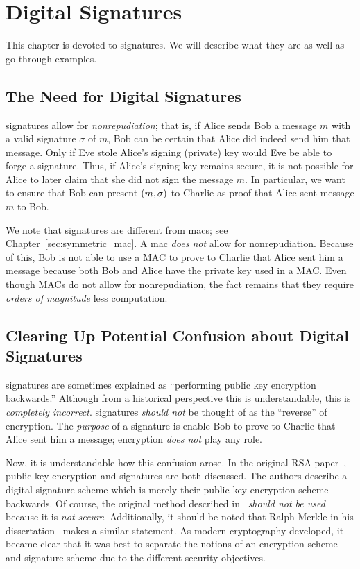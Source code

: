 \chapter{Digital Signatures}
\label{chap:signatures}

This chapter is devoted to \glspl{signature}.
We will describe what they are as well as go through examples.



\section{The Need for Digital Signatures}

\Glspl{signature} allow for \emph{nonrepudiation};
that is, if Alice sends Bob a message $m$ with a valid \gls{signature}
$\sigma$ of $m$, Bob can be certain that Alice did indeed
send him that message.
Only if Eve stole Alice's signing (private) key would Eve be able
to forge a signature.
Thus, if Alice's signing key remains secure, it is not possible
for Alice to later claim that she did not sign the message $m$.
In particular, we want to ensure that Bob can present $\left( m,\sigma \right)$
to Charlie as proof that Alice sent message $m$ to Bob.

We note that \glspl{signature} are different from \glspl{mac};
see Chapter~\ref{sec:symmetric_mac}.
A \gls{mac} \emph{does not} allow for nonrepudiation.
Because of this, Bob is not able to use a MAC to prove to Charlie
that Alice sent him a message because both Bob and Alice
have the private key used in a MAC.
Even though MACs do not allow for nonrepudiation,
the fact remains that they require \emph{orders of magnitude}
less computation.



\section{Clearing Up Potential Confusion about Digital Signatures}

\Glspl{signature} are sometimes explained as
``performing \gls{public key encryption} backwards.''
Although from a historical perspective this is understandable,
this is \emph{completely incorrect}.
\Glspl{signature} \emph{should not} be thought of as the ``reverse''
of encryption.
The \emph{purpose} of a \gls{signature} is enable Bob to prove to Charlie
that Alice sent him a message;
encryption \emph{does not} play any role.

Now, it is understandable how this confusion arose.
In the original RSA paper~\cite{RSApaper},
\gls{public key encryption} and \glspl{signature} are both discussed.
The authors describe a digital signature scheme which is merely
their \gls{public key encryption} scheme backwards.
Of course, the original method described in~\cite{RSApaper}
\emph{should not be used} because it is \emph{not secure}.
Additionally, it should be noted that Ralph Merkle in his
dissertation~\cite[Chapter~1.4]{merkle1979secrecy}
makes a similar statement.
As modern cryptography developed, it became clear that it was best
to separate the notions of an \gls{encryption scheme}
and \gls{signature} scheme due to the different security objectives.

